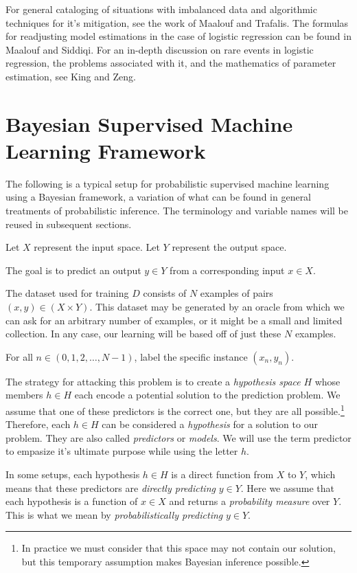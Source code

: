 \documentclass[twoside]{article}
\begin{document}
For general cataloging of situations with imbalanced data and algorithmic techniques for it's mitigation, see the work of Maalouf and Trafalis\cite{rareevents}. The formulas for readjusting model estimations in the case of logistic regression can be found in Maalouf and Siddiqi\cite{weightedlogistic}. For an in-depth discussion on rare events in logistic regression, the problems associated with it, and the mathematics of parameter estimation, see King and Zeng\cite{king}.

\section{Bayesian Supervised Machine Learning Framework} \label{framework}

The following is a typical setup for probabilistic supervised machine learning using a Bayesian framework, a variation of what can be found in general treatments of probabilistic inference\cite{pythonbayes}\cite{gelmanbayes}\cite{blais}. The terminology and variable names will be reused in subsequent sections.

Let \(X\) represent the input space. Let \(Y\) represent the output space.

The goal is to predict an output \(y \in Y\) from a corresponding input \(x \in X\).

The dataset used for training \(D\) consists of \(N\) examples of pairs \((x, y) \in (X \times Y) \).  This dataset may be generated by an oracle from which we can ask for an arbitrary number of examples, or it might be a small and limited collection. In any case, our learning will be based off of just these \(N\) examples.

For all \(n \in (0, 1, 2,\ldots,N-1)\), label the specific instance \((x_n, y_n)\).

The strategy for attacking this problem is to create a \textit{hypothesis space} \(H\) whose members \(h \in H\) each encode a potential solution to the prediction problem. We assume that one of these predictors is the correct one, but they are all possible.\footnote{In practice we must consider that this space may not contain our solution, but this temporary assumption makes Bayesian inference possible.} Therefore, each \(h \in H\) can be considered a \textit{hypothesis} for a solution to our problem. They are also called \textit{predictors} or \textit{models}. We will use the term predictor to empasize it's ultimate purpose while using the letter \(h\).

In some setups, each hypothesis \(h \in H\) is a direct function from \(X\) to \(Y\), which means that these predictors are \textit{directly predicting} \(y \in Y\). Here we assume that each hypothesis is a function of \(x \in X\) and returns a \textit{probability measure} over \(Y\). This is what we mean by \textit{probabilistically predicting} \(y \in Y\).
\end{document}
